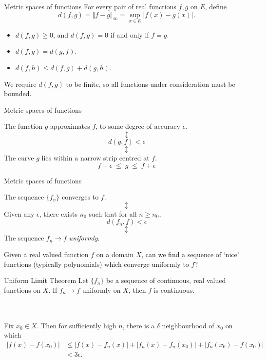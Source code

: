 \documentclass{beamer}
\begin{document}
    \begin{frame}{Metric spaces of functions}
        For every pair of real functions $f, g$ on $E$, define \[
            d(f, g) = \Vert f - g\Vert_\infty = \sup_{x \in E} |f(x) - g(x)|.
        \] 

        \begin{itemize}
            \item $d(f, g) \geq 0$, and $d(f, g) = 0$ if and only if $f = g$.
            \item $d(f, g) = d(g, f)$.
            \item $d(f, h) \leq d(f, g) + d(g, h)$.
        \end{itemize}

        We require $d(f, g)$ to be finite, so all functions under consideration must be
        bounded.
    \end{frame}

    \begin{frame}{Metric spaces of functions}
    \begin{center}
    The function $g$ approximates $f$, to some degree of accuracy $\epsilon$.
    \[\updownarrow\]
    \[
        d(g, f) < \epsilon
    \]
    \[\updownarrow\]
    The curve $g$ lies within a narrow strip centred at $f$.
    \[
        f - \epsilon \;\leq\; g \;\leq\; f + \epsilon
    \] 
    \end{center}
    \end{frame}

    \begin{frame}{Metric spaces of functions}
    \begin{center}
        The sequence $\{f_n\}$ converges to $f$.
        \[\updownarrow\]
        Given any $\epsilon$, there exists $n_0$ such that for all $n \geq n_0$,
        \[
        d(f_n, f) < \epsilon
        \]
        \[\updownarrow\]
        The sequence $f_n \to f$ \emph{uniformly}.
    \end{center}
    \end{frame}

    \begin{frame}
        Given a real valued function $f$ on a domain $X$, can we find a sequence of
        `nice' functions (typically polynomials) which converge uniformly to $f$?
    \end{frame}

    \begin{frame}{Uniform Limit Theorem}
        Let $\{f_n\}$ be a sequence of continuous, real valued functions on $X$. If
        $f_n \to f$ uniformly on $X$, then $f$ is continuous.

        \\~\\

        Fix $x_0 \in X$. Then for sufficiently high $n$, there is a $\delta$
        neighbourhood of $x_0$ on which
        \begin{align*}
            |f(x) - f(x_0)|
                &\leq |f(x) - f_n(x)| + |f_n(x) - f_n(x_0)| + |f_n(x_0) - f(x_0)| \\
                &< 3\epsilon. \tag*{\qed}
        \end{align*}
    \end{frame}
\end{document}

